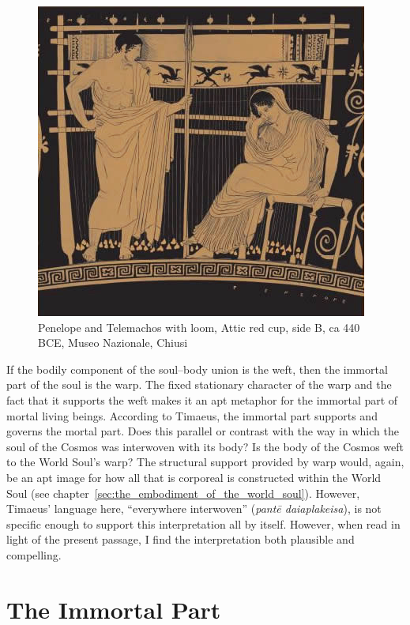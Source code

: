 \begin{figure}[htbp]
     \centering
         \includegraphics[scale=0.80]{graphics/penelope_chiusi.jpg}
     \caption{Penelope and Telemachos with loom, Attic red cup, side B, ca 440 BCE, Museo Nazionale, Chiusi}
     \label{fig:loom}
\end{figure}

If the bodily component of the soul--body union is the weft, then the immortal part of the soul is the warp. The fixed stationary character of the warp and the fact that it supports the weft makes it an apt metaphor for the immortal part of mortal living beings. According to Timaeus, the immortal part supports and governs the mortal part. Does this parallel or contrast with the way in which the soul of the Cosmos was interwoven with its body? Is the body of the Cosmos weft to the World Soul's warp? The structural support provided by warp would, again, be an apt image for how all that is corporeal is constructed within the World Soul (see chapter~\ref{sec:the_embodiment_of_the_world_soul}). However, Timaeus' language here, ``everywhere interwoven'' (\emph{pantē daiaplakeisa}), is not specific enough to support this interpretation all by itself. However, when read in light of the present passage, I find the interpretation both plausible and compelling.


\section{The Immortal Part} %
\label{sec:the_immortal_part}

